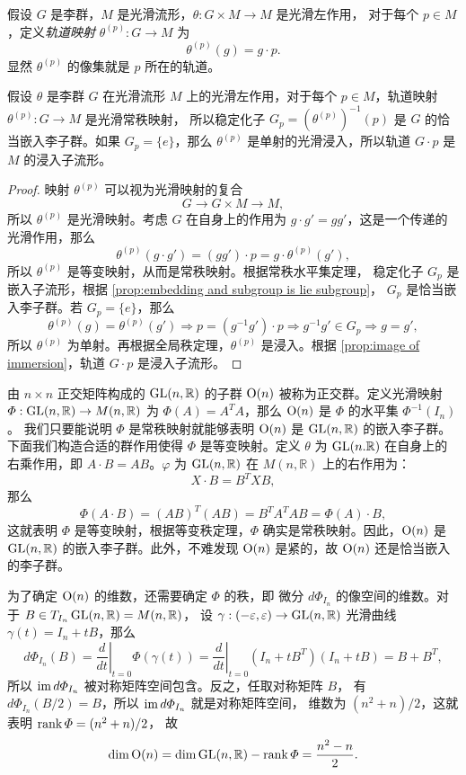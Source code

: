 假设 $G$ 是李群，$M$ 是光滑流形，$\theta:G\times M\to M$ 是光滑左作用，
对于每个 $p\in M$，定义\emph{轨道映射} $\theta^{(p)}:G\to M$ 为
\[
  \theta^{(p)}(g)=g\cdot p.  
\]
显然 $\theta^{(p)}$ 的像集就是 $p$ 所在的轨道。

\begin{proposition}[轨道映射的性质]
  假设 $\theta$ 是李群 $G$ 在光滑流形 $M$ 上的光滑左作用，对于每个
  $p\in M$，轨道映射 $\theta^{(p)}:G\to M$ 是光滑常秩映射，
  所以稳定化子 $G_p=\left(\theta^{(p)}\right)^{-1}(p)$
  是 $G$ 的恰当嵌入李子群。如果 $G_p=\{e\}$，那么
  $\theta^{(p)}$ 是单射的光滑浸入，所以轨道 $G\cdot p$
  是 $M$ 的浸入子流形。
\end{proposition}
\begin{proof}
  映射 $\theta^{(p)}$ 可以视为光滑映射的复合
  \[
    G\to G\times M\to M,  
  \]
  所以 $\theta^{(p)}$ 是光滑映射。考虑 $G$ 在自身上的作用为
  $g\cdot g'=gg'$，这是一个传递的光滑作用，那么
  \[
    \theta^{(p)}(g\cdot g')=(gg')\cdot p=g\cdot \theta^{(p)}(g'),  
  \]
  所以 $\theta^{(p)}$ 是等变映射，从而是常秩映射。根据常秩水平集定理，
  稳定化子 $G_p$ 是嵌入子流形，根据 \autoref{prop:embedding and subgroup is lie subgroup}，
  $G_p$ 是恰当嵌入李子群。若 $G_p=\{e\}$，那么
  \[
    \theta^{(p)}(g)=\theta^{(p)}(g')\Rightarrow
    p=(g^{-1}g')\cdot p\Rightarrow g^{-1}  g'\in G_p
    \Rightarrow g=g',
  \]
  所以 $\theta^{(p)}$ 为单射。再根据全局秩定理，$\theta^{(p)}$
  是浸入。根据 \autoref{prop:image of immersion}，轨道 $G\cdot p$
  是浸入子流形。
\end{proof}

\begin{example}[正交群]\label{exa:orthogonal group}
  由 $n\times n$ 正交矩阵构成的 $\operatorname{GL}(n,\mathbb{R})$ 的子群 
  $\operatorname{O}(n)$ 被称为正交群。定义光滑映射 $\varPhi:\operatorname{GL}(n,\mathbb{R})\to M(n,\mathbb{R})$
  为 $\varPhi(A)=A^TA$，那么 $\operatorname{O}(n)$ 是 $\varPhi$ 的水平集 $\varPhi^{-1}(I_n)$。
  我们只要能说明 $\varPhi$ 是常秩映射就能够表明 $\operatorname{O}(n)$ 是 
  $\operatorname{GL}(n,\mathbb{R})$ 的嵌入李子群。下面我们构造合适的群作用使得
  $\varPhi$ 是等变映射。定义 $\theta$ 为 $\operatorname{GL}(n.\mathbb{R})$
  在自身上的右乘作用，即 $A\cdot B=AB$。$\varphi$
  为 $\operatorname{GL}(n,\mathbb{R})$ 在 $M(n,\mathbb{R})$ 上的右作用为：
  \[
    X\cdot B=B^TXB,  
  \]
  那么
  \[
    \varPhi(A\cdot B)=(AB)^T(AB)=B^TA^TAB=\varPhi(A)\cdot B ,
  \]
  这就表明 $\varPhi$ 是等变映射，根据等变秩定理，$\varPhi$
  确实是常秩映射。因此，$\operatorname{O}(n)$ 是 $\operatorname{GL}(n,\mathbb{R})$
  的嵌入李子群。此外，不难发现 $\operatorname{O}(n)$ 是紧的，故 $\operatorname{O}(n)$ 还是恰当嵌入的李子群。

  为了确定 $\operatorname{O}(n)$ 的维数，还需要确定 $\varPhi$ 的秩，即
  微分 $d\varPhi_{I_n}$ 的像空间的维数。对于 $B\in T_{I_n}\operatorname{GL}(n,\mathbb{R})=M(n,\mathbb{R})$，
  设 $\gamma:(-\varepsilon,\varepsilon)\to \operatorname{GL}(n,\mathbb{R})$ 
  光滑曲线 $\gamma(t)=I_n+tB$，那么
  \[
    d\varPhi_{I_n}(B)=\left.\frac{d}{dt}\right|_{t=0}\varPhi(\gamma(t))
    =\left.\frac{d}{dt}\right|_{t=0}(I_n+tB^T)(I_n+tB)
    =B+B^T,
  \]
  所以 $\operatorname{im} d\varPhi_{I_n}$ 被对称矩阵空间包含。反之，任取对称矩阵 $B$，
  有 $d\varPhi_{I_n}(B/2)=B$，所以 $\operatorname{im} d\varPhi_{I_n}$ 就是对称矩阵空间，
  维数为 $(n^2+n)/2$，这就表明 $\operatorname{rank} \varPhi=(n^2+n)/2$，
  故
  \[
    \dim\operatorname{O}(n)=\dim\operatorname{GL}(n,\mathbb{R})-\operatorname{rank} \varPhi
    =\frac{n^2-n}{2}.
  \]
\end{example}


